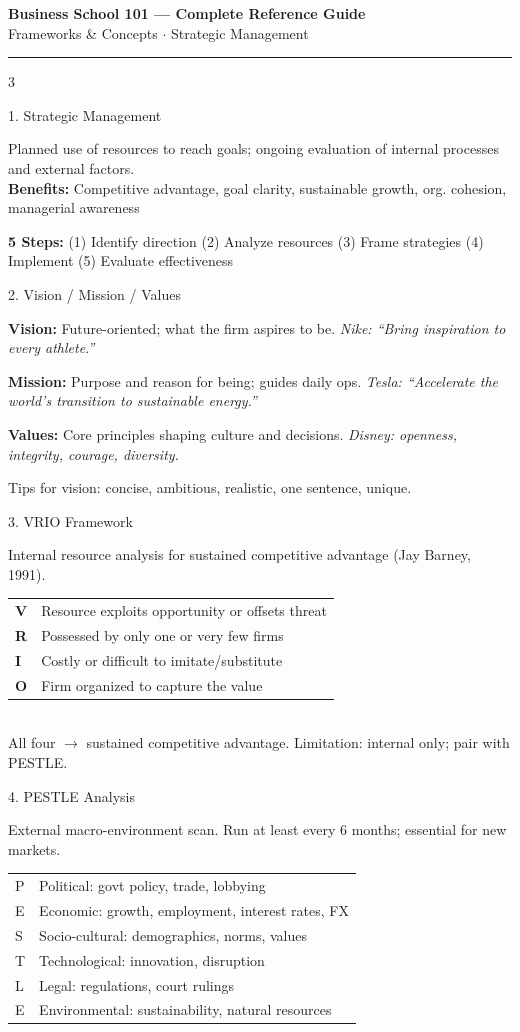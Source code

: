 \documentclass[7.5pt, letterpaper]{article}
\newcommand{\concept}[1]{%
  \vspace{2.5pt}%
  \noindent\colorbox{accent}{\parbox{\dimexpr\linewidth-2\fboxsep}{\fontsize{6.8pt}{7.5pt}\selectfont\bfseries\color{white}\strut #1\strut}}%
  \vspace{1pt}\par%
}
\newcommand{\kv}[2]{\noindent\textbf{#1:} #2\par}
\newcommand{\minitab}[1]{%
  \begingroup
  \fontsize{6.2pt}{7pt}\selectfont
  \setlength{\tabcolsep}{2pt}
  #1
  \endgroup
}
\begin{document}
\begin{center}
{\fontsize{11pt}{13pt}\bfseries\color{accent} Business School 101 --- Complete Reference Guide}\\[1pt]
{\fontsize{6.5pt}{8pt} Frameworks \& Concepts $\cdot$ Strategic Management}
\end{center}
\vspace{-2pt}
{\color{ruled}\hrule}
\vspace{2pt}

\begin{multicols}{3}

\concept{1. Strategic Management}
Planned use of resources to reach goals; ongoing evaluation of internal processes and external factors.\\
\kv{Benefits}{Competitive advantage, goal clarity, sustainable growth, org. cohesion, managerial awareness}
\kv{5 Steps}{(1) Identify direction (2) Analyze resources (3) Frame strategies (4) Implement (5) Evaluate effectiveness}

\concept{2. Vision / Mission / Values}
\kv{Vision}{Future-oriented; what the firm aspires to be. \textit{Nike: ``Bring inspiration to every athlete.''}}
\kv{Mission}{Purpose and reason for being; guides daily ops. \textit{Tesla: ``Accelerate the world's transition to sustainable energy.''}}
\kv{Values}{Core principles shaping culture and decisions. \textit{Disney: openness, integrity, courage, diversity.}}
Tips for vision: concise, ambitious, realistic, one sentence, unique.

\concept{3. VRIO Framework}
Internal resource analysis for sustained competitive advantage (Jay Barney, 1991).\\
\minitab{\begin{tabular}{@{}ll@{}}
\textbf{V} & Resource exploits opportunity or offsets threat\\
\textbf{R} & Possessed by only one or very few firms\\
\textbf{I} & Costly or difficult to imitate/substitute\\
\textbf{O} & Firm organized to capture the value\\
\end{tabular}}\\
All four $\rightarrow$ sustained competitive advantage. Limitation: internal only; pair with PESTLE.

\concept{4. PESTLE Analysis}
External macro-environment scan. Run at least every 6 months; essential for new markets.\\
\minitab{\begin{tabular}{@{}ll@{}}
P & Political: govt policy, trade, lobbying\\
E & Economic: growth, employment, interest rates, FX\\
S & Socio-cultural: demographics, norms, values\\
T & Technological: innovation, disruption\\
L & Legal: regulations, court rulings\\
E & Environmental: sustainability, natural resources\\
\end{tabular}}


\end{multicols}
\end{document}
